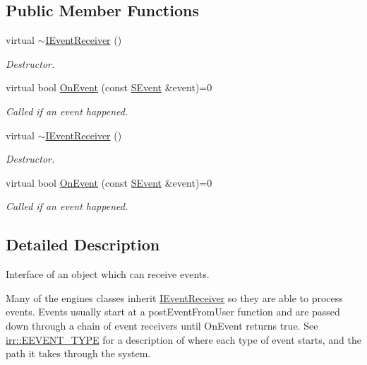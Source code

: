\subsection*{Public Member Functions}
\begin{DoxyCompactItemize}
\item 
\mbox{\label{classirr_1_1IEventReceiver_a4ec011612f02017d95654cf5b5d567b6}} 
virtual \hyperlink{classirr_1_1IEventReceiver_a4ec011612f02017d95654cf5b5d567b6}{$\sim$\+I\+Event\+Receiver} ()
\begin{DoxyCompactList}\small\item\em Destructor. \end{DoxyCompactList}\item 
virtual bool \hyperlink{classirr_1_1IEventReceiver_a571f744ceffc3b4fe8a81f529163eb97}{On\+Event} (const \hyperlink{structirr_1_1SEvent}{S\+Event} \&event)=0
\begin{DoxyCompactList}\small\item\em Called if an event happened. \end{DoxyCompactList}\item 
\mbox{\label{classirr_1_1IEventReceiver_a4ec011612f02017d95654cf5b5d567b6}} 
virtual \hyperlink{classirr_1_1IEventReceiver_a4ec011612f02017d95654cf5b5d567b6}{$\sim$\+I\+Event\+Receiver} ()
\begin{DoxyCompactList}\small\item\em Destructor. \end{DoxyCompactList}\item 
virtual bool \hyperlink{classirr_1_1IEventReceiver_a571f744ceffc3b4fe8a81f529163eb97}{On\+Event} (const \hyperlink{structirr_1_1SEvent}{S\+Event} \&event)=0
\begin{DoxyCompactList}\small\item\em Called if an event happened. \end{DoxyCompactList}\end{DoxyCompactItemize}


\subsection{Detailed Description}
Interface of an object which can receive events. 

Many of the engine\textquotesingle{}s classes inherit \hyperlink{classirr_1_1IEventReceiver}{I\+Event\+Receiver} so they are able to process events. Events usually start at a post\+Event\+From\+User function and are passed down through a chain of event receivers until On\+Event returns true. See \hyperlink{namespaceirr_ac9eed96e06e85ce3c86fcbbbe9e48a0c}{irr\+::\+E\+E\+V\+E\+N\+T\+\_\+\+T\+Y\+PE} for a description of where each type of event starts, and the path it takes through the system. 

